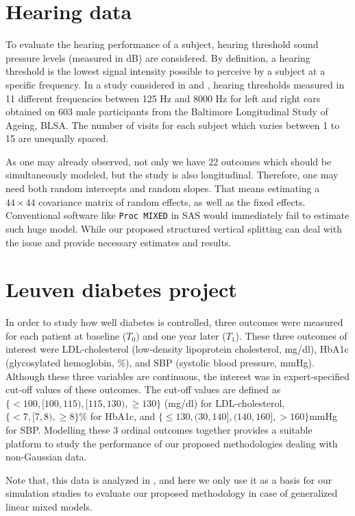 \documentclass[11pt,a5paper,twoside]{book}
\begin{document}
\section{Hearing data} 
\label{mot_hearing}
To evaluate the hearing performance of a subject, hearing threshold sound pressure levels (measured in dB) are considered. By definition, a hearing threshold is the lowest signal intensity possible to perceive by a subject at a specific frequency. In a study considered in \cite{verbeke2009} and \cite{Verbeke2006}, hearing thresholds measured in 11 different frequencies between 125 Hz and 8000 Hz for left and right ears obtained on 603 male participants from the Baltimore Longitudinal Study of Ageing, BLSA. The number of visits for each subject which varies between 1 to 15 are unequally spaced. 

As one may already observed, not only we have 22 outcomes which should be simultaneously modeled, but the study is also longitudinal. Therefore, one may need both random intercepts and random slopes. That means estimating a $44 \times 44$ covariance matrix of random effects, as well as the fixed effects. Conventional software like {\tt{Proc MIXED}} in SAS would immediately fail to estimate such huge model. While our proposed structured vertical splitting can deal with the issue and provide necessary estimates and results.

\section{Leuven diabetes project} 

In order to study how well diabetes is controlled, three outcomes were measured for each patient at baseline ($T_0$) and one year later ($T_1$). These three outcomes of interest were LDL-cholesterol (low-density lipoprotein cholesterol, mg/dl), HbA1c (glycosylated hemoglobin, \%), and SBP (systolic blood pressure, mmHg). Although these three variables are continuous, the interest was in expert-specified cut-off values of these outcomes. The cut-off values are defined as $\{<100, [100,115), [115, 130),\geq 130 \}$ (mg/dl) for LDL-cholesterol, $\{<7, [7, 8), \geq 8\}\%$ for HbA1c, and $\{ \leq 130, (30,140],(140,160],>160\}$mmHg for SBP. Modelling these 3 ordinal outcomes together provides a suitable platform to study the performance of our proposed methodologies dealing with non-Gaussian data.

Note that, this data is analyzed in \cite{ivanova2017}, and here we only use it as a basis for our simulation studies to evaluate our proposed methodology in case of generalized linear mixed models. 
\end{document}
